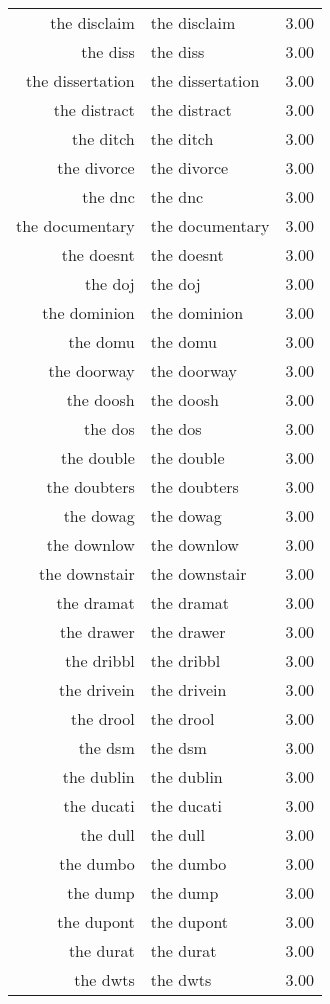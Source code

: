 \begin{table}[ht]
\begin{tabular}{rlr}
  the disclaim & the disclaim & 3.00 \\ 
  the diss & the diss & 3.00 \\ 
  the dissertation & the dissertation & 3.00 \\ 
  the distract & the distract & 3.00 \\ 
  the ditch & the ditch & 3.00 \\ 
  the divorce & the divorce & 3.00 \\ 
  the dnc & the dnc & 3.00 \\ 
  the documentary & the documentary & 3.00 \\ 
  the doesnt & the doesnt & 3.00 \\ 
  the doj & the doj & 3.00 \\ 
  the dominion & the dominion & 3.00 \\ 
  the domu & the domu & 3.00 \\ 
  the doorway & the doorway & 3.00 \\ 
  the doosh & the doosh & 3.00 \\ 
  the dos & the dos & 3.00 \\ 
  the double & the double & 3.00 \\ 
  the doubters & the doubters & 3.00 \\ 
  the dowag & the dowag & 3.00 \\ 
  the downlow & the downlow & 3.00 \\ 
  the downstair & the downstair & 3.00 \\ 
  the dramat & the dramat & 3.00 \\ 
  the drawer & the drawer & 3.00 \\ 
  the dribbl & the dribbl & 3.00 \\ 
  the drivein & the drivein & 3.00 \\ 
  the drool & the drool & 3.00 \\ 
  the dsm & the dsm & 3.00 \\ 
  the dublin & the dublin & 3.00 \\ 
  the ducati & the ducati & 3.00 \\ 
  the dull & the dull & 3.00 \\ 
  the dumbo & the dumbo & 3.00 \\ 
  the dump & the dump & 3.00 \\ 
  the dupont & the dupont & 3.00 \\ 
  the durat & the durat & 3.00 \\ 
  the dwts & the dwts & 3.00 \\ 

\end{tabular}
\end{table}
